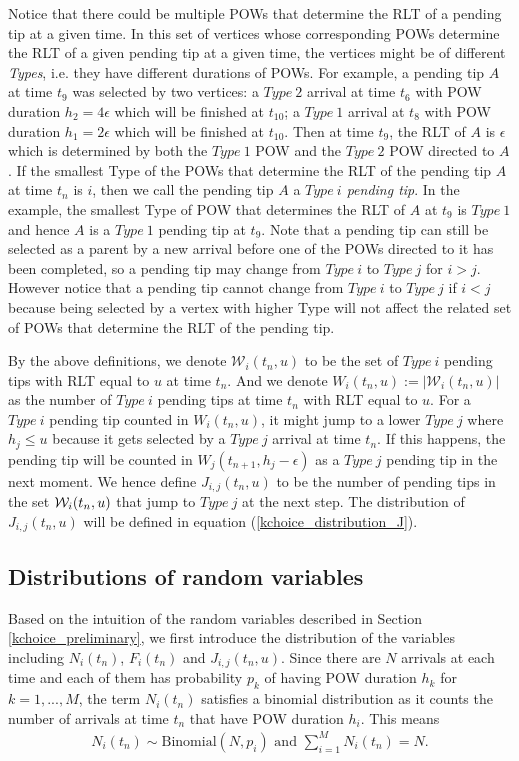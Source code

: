 \documentclass[12pt]{article}
\numberwithin{equation}{section}  %
\begin{document}
Notice that there could be multiple POWs that determine the RLT of a pending tip at a given time. In this set of vertices whose corresponding POWs determine the RLT of a given pending tip at a given time, the vertices might be of different \textit{Types}, i.e. they have different durations of POWs. For example, a pending tip $A$ at time $t_9$ was selected by two vertices: a {$Type\ 2$} arrival at time $t_6$ with POW duration $h_2=4\epsilon$ which will be finished at $t_{10}$; a {$Type\ 1$} arrival at $t_8$ with POW duration $h_1=2\epsilon$ which will be finished at $t_{10}$. Then at time $t_9$, the RLT of $A$ is $\epsilon$ which is determined by both the {$Type\ 1$} POW and the {$Type\ 2$} POW directed to $A$. If the smallest Type of the POWs that determine the RLT of the pending tip $A$ at time $t_n$ is $i$, then we call the pending tip $A$ a \textit{$Type\ i$ pending tip}. In the example, the smallest Type of POW that determines the RLT of $A$ at $t_9$ is {$Type\ 1$} and hence $A$ is a {$Type\ 1$} pending tip at $t_9$. Note that a pending tip can still be selected as a parent by a new arrival before one of the POWs directed to it has been completed, so a pending tip may change from {$Type\ i$} to {$Type\ j$} for $i>j$. However notice that a pending tip cannot change from {$Type\ i$} to {$Type\ j$} if $i<j$ because being selected by a vertex with higher Type will not affect the related set of POWs that determine the RLT of the pending tip.

By the above definitions, we denote $\mathcal{W}_i(t_n, u)$ to be the set of {$Type\ i$} pending tips with RLT equal to $u$ at time $t_n$. And we denote $W_i(t_n, u):=|\mathcal{W}_i(t_n, u)|$ as the number of {$Type\ i$} pending tips at time $t_n$ with RLT equal to $u$. For a {$Type\ i$} pending tip counted in $W_i(t_n,u)$, it might jump to a lower {$Type\ j$} where $h_j\leq u$ because it gets selected by a {$Type\ j$} arrival at time $t_n$. If this happens, the pending tip will be counted in $W_j(t_{n+1},h_j-\epsilon)$ as a $Type\ j$ pending tip in the next moment. We hence define $J_{i,j}(t_n,u)$ to be the number of pending tips in the set ${\cal W}_i(t_n, u)$ that jump to {$Type\ j$} at the next step. The distribution of $J_{i,j}(t_n,u)$ will be defined in equation (\ref{kchoice_distribution_J}).

\subsection{Distributions of random variables}\label{kchoice_distribution}
Based on the intuition of the random variables described in Section \ref{kchoice_preliminary}, we first introduce the distribution of the variables including $N_i(t_n)$, $F_i(t_n)$ and $J_{i,j}(t_n,u)$. Since there are $N$ arrivals at each time and each of them has probability $p_k$ of having POW duration $h_k$ for $k=1,...,M$, the term $N_i(t_n)$ satisfies a binomial distribution as it counts the number of arrivals at time $t_n$ that have POW duration $h_i$. This means 
\begin{align}
N_i(t_n)\sim \text{Binomial}(N,p_i) \text{ and } \sum_{i=1}^M N_i(t_n)=N.\label{kchoice_distribution_Ni}
\end{align}
\end{document}
